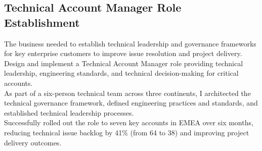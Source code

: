 \subsection{Technical Account Manager Role Establishment}
        The business needed to establish technical leadership and governance frameworks
        for key enterprise customers to improve issue resolution and project delivery.\\
        Design and implement a Technical Account Manager role providing technical leadership,
        engineering standards, and technical decision-making for critical accounts.\\
        As part of a six-person technical team across three continents, I architected the
        technical governance framework, defined engineering practices and standards, and
        established technical leadership processes.\\
        Successfully rolled out the role to seven key accounts in EMEA over six months,
        reducing technical issue backlog by 41\% (from 64 to 38) and improving project
        delivery outcomes.\\

